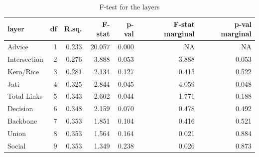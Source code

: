 \begin{table}

\caption{F-test for the layers}
\centering
\begin{tabular}[t]{lrrrrrr}
\toprule
layer & df & R.sq. & F-stat & p-val & F-stat marginal & p-val marginal\\
\midrule
Advice & 1 & 0.233 & 20.057 & 0.000 & NA & NA\\
Intersection & 2 & 0.276 & 3.888 & 0.053 & 3.888 & 0.053\\
Kero/Rice & 3 & 0.281 & 2.134 & 0.127 & 0.415 & 0.522\\
Jati & 4 & 0.325 & 2.844 & 0.045 & 4.059 & 0.048\\
Total Links & 5 & 0.343 & 2.602 & 0.044 & 1.771 & 0.188\\
\addlinespace
Decision & 6 & 0.348 & 2.159 & 0.070 & 0.478 & 0.492\\
Backbone & 7 & 0.353 & 1.851 & 0.104 & 0.416 & 0.521\\
Union & 8 & 0.353 & 1.564 & 0.164 & 0.021 & 0.884\\
Social & 9 & 0.353 & 1.349 & 0.238 & 0.026 & 0.873\\
\bottomrule
\end{tabular}
\end{table}
